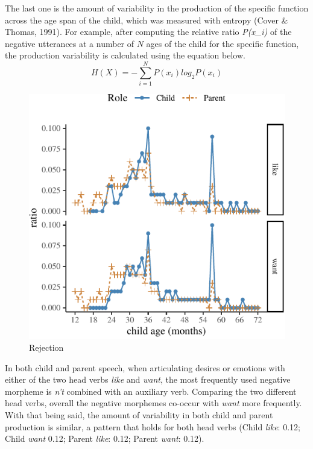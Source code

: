 \documentclass[
  english,
  man,floatsintext]{apa6}
\begin{document}
The last one is the amount of variability in the production of the specific function across the age span of the child, which was measured with entropy (Cover \& Thomas, 1991). For example, after computing the relative ratio \emph{P(x\_i)} of the negative utterances at a number of \(N\) ages of the child for the specific function, the production variability is calculated using the equation below.
\begin{equation}
H(X) = -\sum_{i=1}^N P(x_i)log_2P(x_i) 
\end{equation}

\begin{figure}[H]

{\centering \includegraphics{neg_combos_full_files/figure-latex/emotion-1} 

}

\caption{Rejection}\label{fig:emotion}
\end{figure}

In both child and parent speech, when articulating desires or emotions with either of the two head verbs \emph{like} and \emph{want}, the most frequently used negative morpheme is \emph{n't} combined with an auxiliary verb. Comparing the two different head verbs, overall the negative morphemes co-occur with \emph{want} more frequently. With that being said, the amount of variability in both child and parent production is similar, a pattern that holds for both head verbs (Child \emph{like}: 0.12; Child \emph{want} 0.12; Parent \emph{like}: 0.12; Parent \emph{want}: 0.12).
\end{document}
